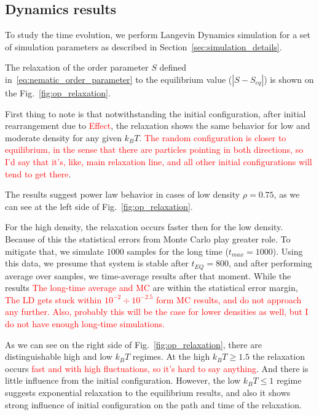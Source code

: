 \subsection{Dynamics results}
\label{subsec:molecular_dynamics_results}

To study the time evolution, we perform Langevin Dynamics simulation for a set of simulation parameters as described in Section~\ref{sec:simulation_details}.

The relaxation of the order parameter $S$ defined in~\eqref{eq:nematic_order_parameter} to the equilibrium value ($|S - S_{eq}|$) is shown on the Fig.~\ref{fig:op_relaxation}.

First thing to note is that notwithstanding the initial configuration, after initial rearrangement due to \textcolor{red}{Effect}, the relaxation shows the same behavior for low and moderate density for any given $k_BT$. \textcolor{red}{The random configuration is closer to equilibrium, in the sense that there are particles pointing in both directions, so I'd say that it's, like, main relaxation line, and all other initial configurations will tend to get there}. 

The results suggest power law behavior in cases of low density $\rho = 0.75$, as we can see at the left side of Fig.~\ref{fig:op_relaxation}.

For the high density, the relaxation occurs faster then for the low density. Because of this the statistical errors from Monte Carlo play greater role. To mitigate that, we simulate $1000$ samples for the long time ($t_{max} = 1000$). Using this data, we presume that system is stable after $t_{EQ} = 800$, and after performing average over samples, we time-average results after that moment. While the results \textcolor{red}{The long-time average and MC} are within the statistical error margin, \textcolor{red}{The LD gets stuck within $10^{-2} \div 10^{-2.5}$ form MC results, and do not approach any further. Also, probably this will be the case for lower densities as well, but I do not have enough long-time simulations.}

As we can see on the right side of Fig.~\ref{fig:op_relaxation}, there are distinguishable high and low $k_BT$ regimes. At the high $k_BT \geq 1.5$ the relaxation occurs \textcolor{red}{fast and with high fluctuations, so it's hard to say anything}. And there is little influence from the initial configuration. However, the low $k_BT \leq 1$ regime suggests exponential relaxation to the equilibrium results, and also it shows strong influence of initial configuration on the path and time of the relaxation. 

